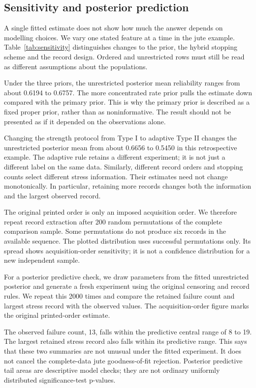 \subsection{Sensitivity and posterior prediction}\label{sec:sensitivity}
A single fitted estimate does not show how much the answer depends on modelling choices. We vary one stated feature at a time in the jute example. Table~\ref{tab:sensitivity} distinguishes changes to the prior, the hybrid stopping scheme and the record design. Ordered and unrestricted rows must still be read as different assumptions about the populations.



Under the three priors, the unrestricted posterior mean reliability ranges from about 0.6194 to 0.6757. The more concentrated rate prior pulls the estimate down compared with the primary prior. This is why the primary prior is described as a fixed proper prior, rather than as noninformative. The result should not be presented as if it depended on the observations alone.

Changing the strength protocol from Type I to adaptive Type II changes the unrestricted posterior mean from about 0.6656 to 0.5450 in this retrospective example. The adaptive rule retains a different experiment; it is not just a different label on the same data. Similarly, different record orders and stopping counts select different stress information. Their estimates need not change monotonically. In particular, retaining more records changes both the information and the largest observed record.

The original printed order is only an imposed acquisition order. We therefore repeat record extraction after 200 random permutations of the complete comparison sample. Some permutations do not produce six records in the available sequence. The plotted distribution uses successful permutations only. Its spread shows acquisition-order sensitivity; it is not a confidence distribution for a new independent sample.



For a posterior predictive check, we draw parameters from the fitted unrestricted posterior and generate a fresh experiment using the original censoring and record rules. We repeat this 2000 times and compare the retained failure count and largest stress record with the observed values. The acquisition-order figure marks the original printed-order estimate.




The observed failure count, 13, falls within the predictive central range of 8 to 19. The largest retained stress record also falls within its predictive range. This says that these two summaries are not unusual under the fitted experiment. It does not cancel the complete-data jute goodness-of-fit rejection. Posterior predictive tail areas are descriptive model checks; they are not ordinary uniformly distributed significance-test p-values.
